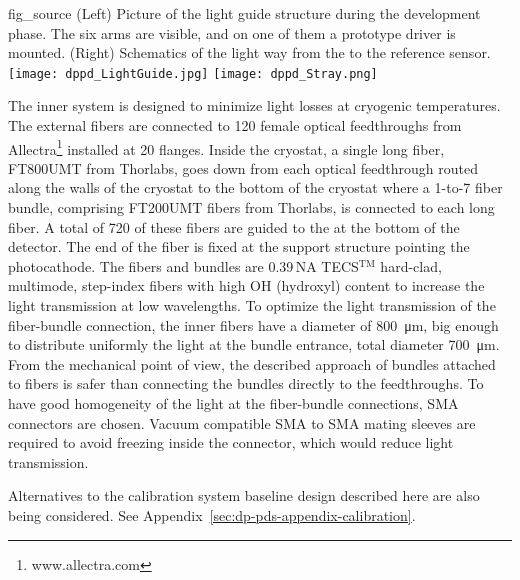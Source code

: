\begin{dunefigure}{fig_source}
{(Left) Picture of the light guide structure during the development phase. The six arms are visible, and on one of them a prototype  driver is mounted. (Right) Schematics of the light way from the  to the reference sensor.}
\texttt{[image: dppd\_LightGuide.jpg]}
\texttt{[image: dppd\_Stray.png]}
\end{dunefigure}





The inner system is designed to minimize light losses at cryogenic temperatures. The external fibers are connected to 120 female optical feedthroughs from Allectra\footnote{www.allectra.com} installed at \num{20} flanges. Inside the cryostat, a single long fiber, FT800UMT from Thorlabs, goes down from each optical feedthrough routed along the walls of the cryostat to the bottom of the cryostat where a \num{1}-to-\num{7} fiber bundle, comprising FT200UMT fibers from Thorlabs, is connected to each long fiber. A total of \num{720} of these fibers are guided to the  at the bottom of the detector. The end of the fiber is fixed at the  support structure pointing the photocathode. The fibers and bundles are \num{0.39}\,NA TECS$^\text{TM}$ hard-clad, multimode, step-index fibers with high OH (hydroxyl) content to increase the light transmission at low wavelengths. To optimize the light transmission of the fiber-bundle connection, the inner fibers have a diameter of \SI{800}{\um}, big enough to distribute uniformly the light at the bundle entrance, total diameter \SI{700}{\um}. From the mechanical point of view, the described approach of bundles attached to fibers is safer than connecting  the bundles directly to the feedthroughs. To have good homogeneity of the light at the fiber-bundle connections, SMA connectors are chosen. Vacuum compatible SMA to SMA mating sleeves are required to avoid  freezing inside the connector, which would reduce light transmission.

Alternatives to the calibration system baseline design described here are also being considered. See Appendix~\ref{sec:dp-pds-appendix-calibration}. 


